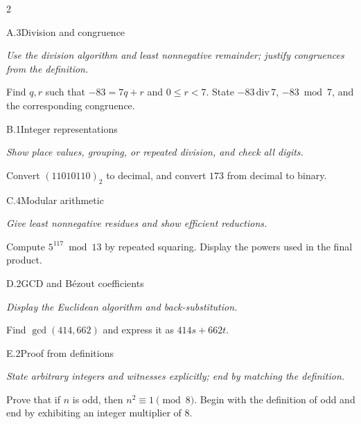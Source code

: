 \documentclass[9pt]{extarticle}
\begin{document}
\begin{multicols}{2}
\begin{CoreProblem}{A.3}{Division and congruence}
{\scriptsize\textit{Use the division algorithm and least nonnegative remainder; justify congruences from the definition.}\par}
Find $q,r$ such that $-83=7q+r$ and $0\le r<7$. State
$-83\,\mathrm{div}\,7$, $-83\bmod7$, and the corresponding congruence.
\end{CoreProblem}
\begin{CoreProblem}{B.1}{Integer representations}
{\scriptsize\textit{Show place values, grouping, or repeated division, and check all digits.}\par}
Convert $(11010110)_2$ to decimal, and convert $173$ from decimal to binary.
\end{CoreProblem}
\begin{CoreProblem}{C.4}{Modular arithmetic}
{\scriptsize\textit{Give least nonnegative residues and show efficient reductions.}\par}
Compute $5^{117}\bmod13$ by repeated squaring. Display the powers used in the
final product.
\end{CoreProblem}
\columnbreak
\begin{CoreProblem}{D.2}{GCD and B\'ezout coefficients}
{\scriptsize\textit{Display the Euclidean algorithm and back-substitution.}\par}
Find $\gcd(414,662)$ and express it as $414s+662t$.
\end{CoreProblem}
\begin{CoreProblem}{E.2}{Proof from definitions}
{\scriptsize\textit{State arbitrary integers and witnesses explicitly; end by matching the definition.}\par}
Prove that if $n$ is odd, then $n^2\equiv1\pmod{8}$. Begin with the definition
of odd and end by exhibiting an integer multiplier of $8$.
\end{CoreProblem}
\end{multicols}
\CoreWorkArea
\FormBreak
{}
\end{document}
